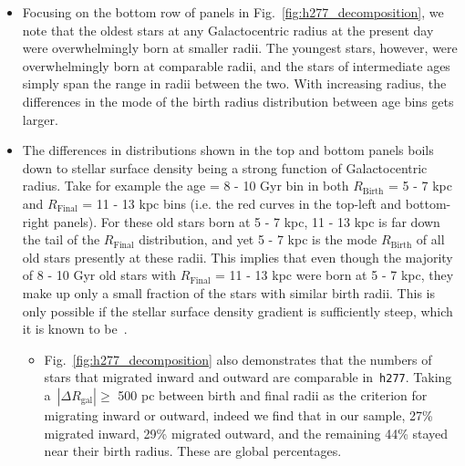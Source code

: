 \documentclass[fleqn, usenatbib]{mnras}
\begin{document}
\begin{itemize}
\begin{itemize}
		\item Focusing on the bottom row of panels in 
		Fig.~\ref{fig:h277_decomposition}, we note that the oldest stars at any 
		Galactocentric radius at the present day were overwhelmingly born at 
		smaller radii. The youngest stars, however, were overwhelmingly born at 
		comparable radii, and the stars of intermediate ages simply span the 
		range in radii between the two. With increasing radius, the 
		differences in the mode of the birth radius distribution between age 
		bins gets larger. 

		\item The differences in distributions shown in the top and bottom 
		panels boils down to stellar surface density being a strong function 
		of Galactocentric radius. Take for example the age = 8 - 10 Gyr bin in 
		both $R_\text{Birth}$ = 5 - 7 kpc and $R_\text{Final}$ = 11 - 13 kpc 
		bins (i.e. the red curves in the top-left and bottom-right panels). 
		For these old stars born at 5 - 7 kpc, 11 - 13 kpc is far down the tail 
		of the $R_\text{Final}$ distribution, and yet 5 - 7 kpc is the mode 
		$R_\text{Birth}$ of all old stars presently at these radii. This 
		implies that even though the majority of 8 - 10 Gyr old stars with 
		$R_\text{Final}$ = 11 - 13 kpc were born at 5 - 7 kpc, they make up 
		only a small fraction of the stars with similar birth radii. This is 
		only possible if the stellar surface density gradient is sufficiently 
		steep, which it is known to be~\citep[e.g.][]{Bland-Hawthorn2016}. 
		\begin{itemize} 
			\item Fig.~\ref{fig:h277_decomposition} also demonstrates that the 
			numbers of stars that migrated inward and outward are comparable 
			in~\texttt{h277}. Taking a~$\left|\Delta R_\text{gal}\right| \geq$ 
			500 pc between birth and final radii as the criterion for migrating 
			inward or outward, indeed we find that in our sample, 27\% 
			migrated inward, 29\% migrated outward, and the remaining 44\% 
			stayed near their birth radius. These are global percentages. 
		\end{itemize} 


\end{itemize}
\end{itemize}
\end{document}
